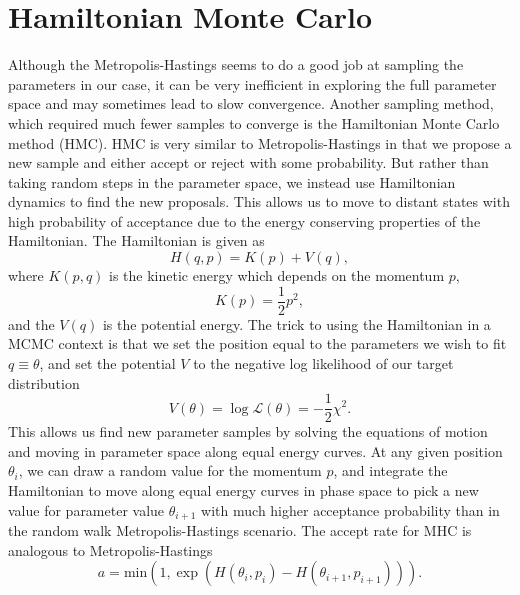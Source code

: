 \documentclass{article}
\begin{document}
\section{Hamiltonian Monte Carlo}
Although the Metropolis-Hastings seems to do a good job at sampling the parameters in our case, it can be very inefficient in exploring the full parameter space and may sometimes lead to slow convergence. Another sampling method, which required much fewer samples to converge is the Hamiltonian Monte Carlo method (HMC). HMC is very similar to Metropolis-Hastings in that we propose a new sample and either accept or reject with some probability. But rather than taking random steps in the parameter space, we instead use Hamiltonian dynamics to find the new proposals. This allows us to move to distant states with high probability of acceptance due to the energy conserving properties of the Hamiltonian. The Hamiltonian is given as
\begin{equation}
H(q, p) = K(p) + V(q),
\end{equation}
where $K(p, q)$ is the kinetic energy which depends on the momentum $p$,
\begin{equation}
    K(p) = \frac{1}{2}p^2,
\end{equation}
and the $V(q)$ is the potential energy. The trick to using the Hamiltonian in a MCMC context is that we set the position equal to the parameters we wish to fit $q \equiv \theta$, and set the potential $V$ to the negative log likelihood of our target distribution
\begin{equation}
    V(\theta) = \log \mathcal{L}(\theta) = -\frac{1}{2}\chi^2.
\end{equation}
This allows us find new parameter samples by solving the equations of motion and moving in parameter space along equal energy curves. At any given position $\theta_i$, we can draw a random value for the momentum $p$, and integrate the Hamiltonian to move along equal energy curves in phase space to pick a new value for parameter value $\theta_{i+1}$ with much higher acceptance probability than in the random walk Metropolis-Hastings scenario. The accept rate for MHC is analogous to Metropolis-Hastings
\begin{equation}
    a = \mathrm{min} \left(1, \exp \left( H(\theta_i, p_i) - H(\theta_{i+1}, p_{i+1})\right) \right).
\end{equation}
\end{document}

